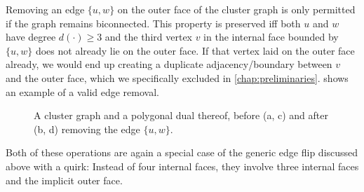Removing an edge $\{u,w\}$ on the outer face of the cluster graph is only permitted if the graph remains biconnected.
This property is preserved iff both $u$ and $w$ have degree $d(\cdot) \geq 3$ and the third vertex $v$ in the internal face bounded by $\{u,w\}$ does not already lie on the outer face.
If that vertex laid on the outer face already, we would end up creating a duplicate adjacency/boundary between $v$ and the outer face, which we specifically excluded in \cref{chap:preliminaries}.
 shows an example of a valid edge removal.

\begin{figure}[H]
	\centering
	\quad
	\qquad
	\quad
	\caption{A cluster graph and a polygonal dual thereof, before (a, c) and after (b, d) removing the edge $\{u,w\}$.}
	\label{fig:flip-edge-example-remove}
\end{figure}

Both of these operations are again a special case of the generic edge flip discussed above with a quirk:
Instead of four internal faces, they involve three internal faces and the implicit outer face.

